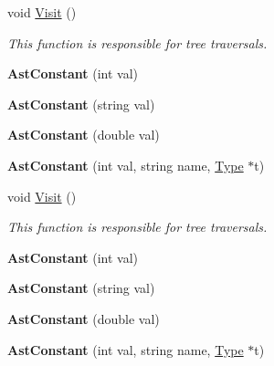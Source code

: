 \begin{DoxyCompactItemize}
\item 
void \hyperlink{classAstConstant_ac13b7246f9d646a5ff00efee4c39bc6b}{Visit} ()
\begin{DoxyCompactList}\small\item\em This function is responsible for tree traversals. \end{DoxyCompactList}\item 
\hypertarget{classAstConstant_ab3d7bb141b6d2650498569fa7742237f}{{\bfseries Ast\-Constant} (int val)}\label{classAstConstant_ab3d7bb141b6d2650498569fa7742237f}

\item 
\hypertarget{classAstConstant_a071adbaa9ea9ad30cde38d68b4182cd9}{{\bfseries Ast\-Constant} (string val)}\label{classAstConstant_a071adbaa9ea9ad30cde38d68b4182cd9}

\item 
\hypertarget{classAstConstant_aef9142c2750c7ad8e83183c7b8ade0e8}{{\bfseries Ast\-Constant} (double val)}\label{classAstConstant_aef9142c2750c7ad8e83183c7b8ade0e8}

\item 
\hypertarget{classAstConstant_a9ceaff3b1de813268a88d7fded0aeb0c}{{\bfseries Ast\-Constant} (int val, string name, \hyperlink{classType}{Type} $\ast$t)}\label{classAstConstant_a9ceaff3b1de813268a88d7fded0aeb0c}

\item 
void \hyperlink{classAstConstant_ac13b7246f9d646a5ff00efee4c39bc6b}{Visit} ()
\begin{DoxyCompactList}\small\item\em This function is responsible for tree traversals. \end{DoxyCompactList}\item 
\hypertarget{classAstConstant_ab3d7bb141b6d2650498569fa7742237f}{{\bfseries Ast\-Constant} (int val)}\label{classAstConstant_ab3d7bb141b6d2650498569fa7742237f}

\item 
\hypertarget{classAstConstant_a071adbaa9ea9ad30cde38d68b4182cd9}{{\bfseries Ast\-Constant} (string val)}\label{classAstConstant_a071adbaa9ea9ad30cde38d68b4182cd9}

\item 
\hypertarget{classAstConstant_aef9142c2750c7ad8e83183c7b8ade0e8}{{\bfseries Ast\-Constant} (double val)}\label{classAstConstant_aef9142c2750c7ad8e83183c7b8ade0e8}

\item 
\hypertarget{classAstConstant_a9ceaff3b1de813268a88d7fded0aeb0c}{{\bfseries Ast\-Constant} (int val, string name, \hyperlink{classType}{Type} $\ast$t)}\label{classAstConstant_a9ceaff3b1de813268a88d7fded0aeb0c}


\end{DoxyCompactItemize}
